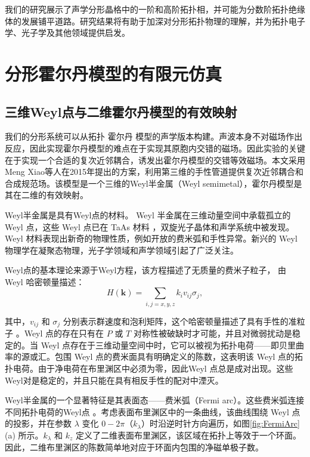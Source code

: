 我们的研究展示了声学分形晶格中的一阶和高阶拓扑相，并可能为分数阶拓扑绝缘体的发展铺平道路。研究结果将有助于加深对分形拓扑物理的理解，并为拓扑电子学、光子学及其他领域提供启发。

\section{分形霍尔丹模型的有限元仿真}
\subsection{三维Weyl点与二维霍尔丹模型的有效映射}
我们的分形系统可以从拓扑 霍尔丹 模型的声学版本构建。声波本身不对磁场作出反应，因此实现霍尔丹模型的难点在于实现其原胞内交错的磁场。因此实验的关键在于实现一个合适的复次近邻耦合，诱发出霍尔丹模型的交错等效磁场。本文采用Meng Xiao等人在2015年提出的方案\cite{xiao2015synthetic}，利用第三维的手性管道提供复次近邻耦合和合成规范场。该模型是一个三维的Weyl半金属（Weyl semimetal），霍尔丹模型是其在二维的有效映射。

Weyl半金属是具有Weyl点的材料\cite{wan2011topological}。 Weyl 半金属在三维动量空间中承载孤立的 Weyl 点，这些 Weyl 点已在 TaAs 材料\cite{lv2015experimental,xu2015discovery} ，双旋光子晶体\cite{lu2015experimental}和声学系统\cite{li2018weyl,ge2018experimental}中被发现。 Weyl 材料表现出新奇的物理性质，例如开放的费米弧\cite{wan2011topological}和手性异常\cite{nielsen1983adler}。新兴的 Weyl 物理学在凝聚态物理，光子学领域和声学领域引起了广泛关注。

Weyl点的基本理论来源于Weyl方程，该方程描述了无质量的费米子粒子， 由 Weyl 哈密顿量\cite{weyl1929electron}描述：
\begin{equation}
H(\mathbf{k}) = \sum_{i,j=x,y,z} k_i v_{ij} \sigma_j,
\end{equation}

其中，\( v_{ij} \) 和 \( \sigma_j \) 分别表示群速度和泡利矩阵，这个哈密顿量描述了具有手性的准粒子 。Weyl 点的存在只有在 \( P \) 或 \( T \) 对称性被破缺时才可能，并且对微弱扰动是稳定的。当 Weyl 点存在于三维动量空间中时，它可以被视为拓扑电荷——即贝里曲率的源或汇。包围 Weyl 点的费米面具有明确定义的陈数，这表明该 Weyl 点的拓扑电荷。由于净电荷在布里渊区中必须为零，因此Weyl 点总是成对出现。这些Weyl对是稳定的，并且只能在具有相反手性的配对中湮灭。

Weyl半金属的一个显著特征是其表面态——费米弧（Fermi arc）。这些费米弧连接不同拓扑电荷的Weyl点 。考虑表面布里渊区中的一条曲线，该曲线围绕 Weyl 点的投影，并在参数 \( \lambda \) 变化 \( 0 - 2\pi \)（\( k_\lambda \)）时沿逆时针方向遍历，如图\ref{fig:FermiArc}(a) 所示。\( k_\lambda\) 和 \( k_z \) 定义了二维表面布里渊区，该区域在拓扑上等效于一个环面。因此，二维布里渊区的陈数简单地对应于环面内包围的净磁单极子数。

